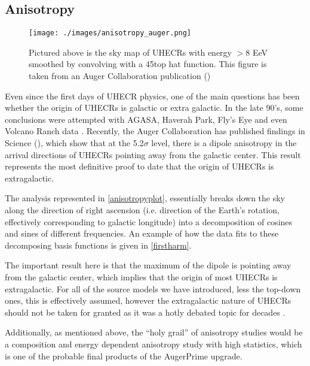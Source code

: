 \subsection{Anisotropy}
\begin{figure}[H]
\begin{center}
\texttt{[image: ./images/anisotropy\_auger.png]}
\caption[Anistropy Sky Map]{Pictured above is the sky map of UHECRs with energy $>8$ EeV smoothed by convolving with a 45\degree top hat function. This figure is taken from an Auger Collaboration publication (\cite{anisotropy})}
\label{anisotropyplot}
\end{center}
\end{figure}

Even since the first days of UHECR physics, one of the main questions has been whether the origin of UHECRs is galactic or extra galactic. In the late 90's, some conclusions were attempted with AGASA, Haverah Park, Fly's Eye and even Volcano Ranch data \cite{tds}. Recently, the Auger Collaboration has published findings in Science (\cite{anisotropy}), which show that at the 5.2$\sigma$ level, there is a dipole anisotropy in the arrival directions of UHECRs pointing away from the galactic center. This result represents the most definitive proof to date that the origin of UHECRs is extragalactic. 

The analysis represented in \autoref{anisotropyplot}, essentially breaks down the sky along the direction of right ascension (i.e. direction of the Earth's rotation, effectively corresponding to galactic longitude) into a decomposition of cosines and sines of different frequencies. An example of how the data fits to these decomposing basis functions is given in \autoref{firstharm}.

The important result here is that the maximum of the dipole is pointing away from the galactic center, which implies that the origin of most UHECRs is extragalactic. For all of the source models we have introduced, less the top-down ones, this is effectively assumed, however the extragalactic nature of UHECRs should not be taken for granted as it was a hotly debated topic for decades \cite{hillas,tds}.

Additionally, as mentioned above, the ``holy grail'' of anisotropy studies would be a composition and energy dependent anisotropy study with high statistics, which is one of the probable final products of the AugerPrime upgrade. 


